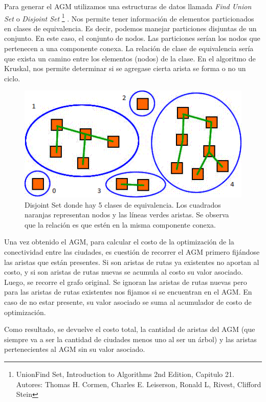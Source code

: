 \quad

\quad Para generar el AGM utilizamos una estructuras de datos llamada \textit{Find Union Set} o \textit{Disjoint Set} \footnote{UnionFind Set, Introduction to Algorithms 2nd Edition, Capitulo 21. Autores: Thomas H. Cormen, Charles E. Leiserson, Ronald L, Rivest, Clifford Stein} . Nos permite tener informaci\'on de elementos particionados en clases de equivalencia. Es decir, podemos manejar particiones disjuntas de un conjunto. En este caso, el conjunto de nodos. Las particiones ser\'ian los nodos que pertenecen a una componente conexa. La relaci\'on de clase de equivalencia ser\'ia que exista un camino entre los elementos (nodos) de la clase. En el algoritmo de Kruskal, nos permite determinar si se agregase cierta arista se forma o no un ciclo.

\quad 


\begin{figure}[H]
	\centering
	\includegraphics[scale=0.8]{DisjointSets.png}
\caption{Disjoint Set donde hay 5 clases de equivalencia. Los cuadrados naranjas representan nodos y las l\'ineas verdes aristas. Se observa que la relaci\'on es que est\'en en la misma componente conexa.}
\end{figure}



\quad Una vez obtenido el AGM, para calcular el costo de la optimizaci\'on de la conectividad entre las ciudades, es cuesti\'on de recorrer el AGM primero fijándose las aristas que est\'an presentes. Si son aristas de rutas ya existentes no aportan al costo, y si son aristas de rutas nuevas se acumula al costo su valor asociado. Luego, se recorre el grafo original. Se ignoran las aristas de rutas nuevas pero para las aristas de rutas existentes nos fijamos si se encuentran en el AGM. En caso de no estar presente, su valor asociado se suma al acumulador de costo de optimizaci\'on.

\quad 

\quad Como resultado, se devuelve el costo total, la cantidad de aristas del AGM (que siempre va a ser la cantidad de ciudades menos uno al ser un \'arbol) y las aristas pertenecientes al AGM sin su valor asociado.

